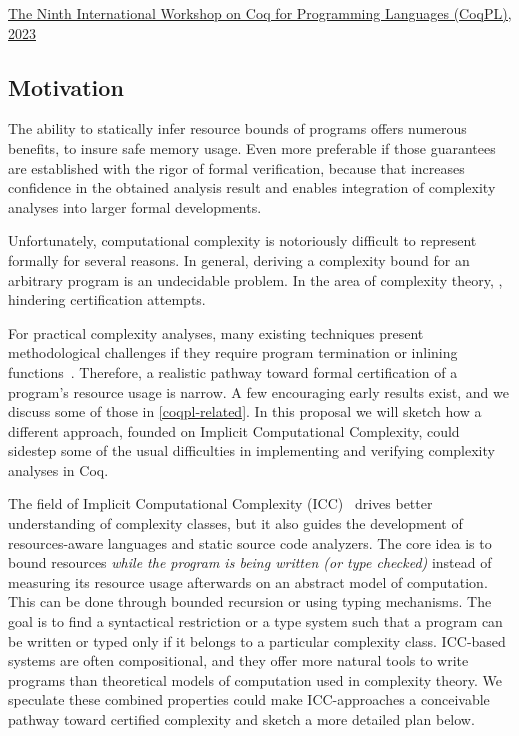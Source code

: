 \pageIconFm
\ainfoX{\CTNT}
{\href{https://popl23.sigplan.org/home/CoqPL-2023}
{The Ninth International Workshop on Coq for Programming Languages (CoqPL), 2023}}
{}

\subsection{Motivation}\label{coqpl-motivation}

The ability to statically infer resource bounds of programs offers numerous benefits, \eg to insure safe memory usage.
Even more preferable if those guarantees are established with the rigor of formal verification,
because that increases confidence in the obtained analysis result and enables integration of complexity
analyses into larger formal developments.

Unfortunately, computational complexity is notoriously difficult to represent formally for several reasons.
In general, deriving a complexity bound for an arbitrary program is an undecidable problem.
In the area of complexity theory, , hindering certification attempts.

For practical complexity analyses, many existing techniques present methodological challenges if they require
\eg program termination or inlining functions~\cite{carbonneaux2015}.
Therefore, a realistic pathway toward formal certification of a program's resource usage is narrow.
A few encouraging early results exist, and we discuss some of those in \autoref{coqpl-related}.
In this proposal we will sketch how a different approach, founded on Implicit Computational Complexity,
could sidestep some of the usual difficulties in implementing and verifying complexity analyses in Coq.

The field of Implicit Computational Complexity (ICC)~\cite{dallago2011} drives better understanding of complexity classes, but it also guides the development of resources-aware languages and static source code analyzers.
The core idea is to bound resources \emph{while the program is being written (or type checked)} instead of measuring its resource usage afterwards on an abstract model of computation.
This can be done through \eg bounded recursion or using typing mechanisms.
The goal is to find a syntactical restriction or a type system such that a program can be written or typed only if it belongs to a particular complexity class.
ICC-based systems are often compositional, and they offer more natural tools to write programs than theoretical models of computation used in complexity theory.
We speculate these combined properties could make ICC-approaches a conceivable pathway toward certified complexity and sketch a more detailed plan below.

